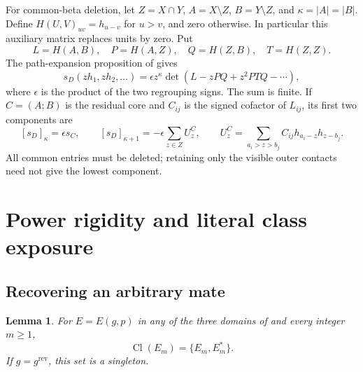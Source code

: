 \documentclass[11pt,a4paper]{amsart}
\numberwithin{equation}{section}
\theoremstyle{plain}
\newtheorem{lemma}[theorem]{Lemma}
\theoremstyle{definition}
\begin{document}
For common-beta deletion, let \(Z=X\cap Y\),
\(A=X\setminus Z\), \(B=Y\setminus Z\), and
\(\kappa=|A|=|B|\).  Define
\(H(U,V)_{uv}=h_{u-v}\) for \(u>v\), and zero otherwise.
In particular this auxiliary matrix replaces units by zero.  Put
\[
 L=H(A,B),\quad P=H(A,Z),\quad Q=H(Z,B),\quad T=H(Z,Z).
\]
The path-expansion proposition of \cite{Shields2026Cofactor} gives
\begin{equation}\label{eq:path-input}
 s_D(zh_1,zh_2,\ldots)
 =\epsilon z^\kappa\det(L-zPQ+z^2PTQ-\cdots),
\end{equation}
where \(\epsilon\) is the product of the two regrouping signs.
The sum is finite.  If \(C=(A;B)\) is the residual core and
\(C_{ij}\) is the signed cofactor of \(L_{ij}\), its first two
components are
\begin{equation}\label{eq:first-correction}
 [s_D]_\kappa=\epsilon s_C,\qquad
 [s_D]_{\kappa+1}=-\epsilon\sum_{z\in Z}U_z^C,
 \qquad
 U_z^C=\sum_{a_i>z>b_j}C_{ij}h_{a_i-z}h_{z-b_j}.
\end{equation}
All common entries must be deleted; retaining only the visible outer
contacts need not give the lowest component.

\section{Power rigidity and literal class exposure}\label{sec:powers}

\subsection{Recovering an arbitrary mate}\label{subsec:power-structure}

\begin{lemma}\label{lem:power-rigidity}
For \(E=E(g,p)\) in any of the three domains of 
and every integer \(m\ge1\),
\[
 \operatorname{Cl}(E_m)=\{E_m,E_m^*\}.
\]
If \(g=g^{\mathrm{rev}}\), this set is a singleton.
\end{lemma}
\end{document}
